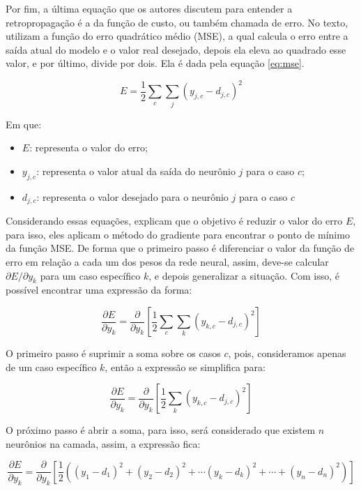 Por fim, a última equação que os autores discutem para entender a retropropagação é a da função de custo, ou também chamada de erro. No texto, \textcite{BackpropagationArticle} utilizam a função do erro quadrático médio (MSE), a qual calcula o erro entre a saída atual do modelo e o valor real desejado, depois ela eleva ao quadrado esse valor, e por último, divide por dois. Ela é dada pela equação \ref{eq:mse}.

\begin{equation}
    E = \frac{1}{2} \sum_{c} \sum_{j} (y_{j, c} - d_{j, c})^2 
    \label{eq:mse}
\end{equation}

Em que:

\begin{itemize}
    \item $E$: representa o valor do erro;
    \item $y_{j, c}$: representa o valor atual da saída do neurônio $j$ para o caso $c$;
    \item $d_{j, c}$: representa o valor desejado para o neurônio $j$ para o caso $c$
\end{itemize}

Considerando essas equações, \textcite{BackpropagationArticle} explicam que o objetivo é reduzir o valor do erro $E$, para isso, eles aplicam o método do gradiente para encontrar o ponto de mínimo da função MSE. De forma que o primeiro passo é diferenciar o valor da função de erro em relação a cada um dos pesos da rede neural, assim, deve-se calcular $\partial E / \partial y_k$ para um caso específico $k$, e depois generalizar a situação. Com isso, é possível encontrar uma expressão da forma:

\[
    \frac{\partial E}{\partial y_k} = \frac{\partial}{\partial y_k} \left[ \frac{1}{2} \sum_c \sum_k (y_{k, c} - d_{j, c})^2\right]
\]

O primeiro passo é suprimir a soma sobre os casos $c$, pois, consideramos apenas de um caso específico $k$, então a expressão se simplifica para:

\[
    \frac{\partial E}{\partial y_k} = \frac{\partial}{\partial y_k} \left[ \frac{1}{2} \sum_k (y_{k, c} - d_{j, c})^2\right]
\]

O próximo passo é abrir a soma, para isso, será considerado que existem $n$ neurônios na camada, assim, a expressão fica:

\[
    \frac{\partial E}{\partial y_k} = \frac{\partial}{\partial y_k} \left[ \frac{1}{2} \left( (y_1 - d_1)^2 + (y_2 - d_2)^2 + \cdots (y_k - d_k)^2 + \cdots + (y_n - d_n)^2 \right) \right]
\]

